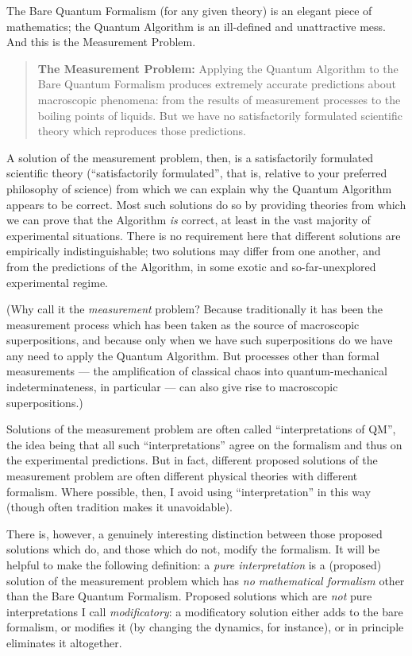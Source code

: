 \documentclass[12pt]{article}
\begin{document}
 The Bare Quantum Formalism (for any given theory) is an elegant piece of mathematics; the Quantum Algorithm is an ill-defined and unattractive mess.  And this is the Measurement Problem.
\begin{quote}
\textbf{The Measurement Problem:} Applying the Quantum Algorithm to the Bare Quantum Formalism produces extremely accurate predictions about macroscopic phenomena: from the results of measurement processes to the boiling points of liquids. But we have no satisfactorily formulated scientific theory which reproduces those predictions.
\end{quote}

A solution of the measurement problem, then, is a satisfactorily formulated scientific theory (``satisfactorily formulated'', that is, relative to your preferred philosophy of science) from which we can explain why the Quantum Algorithm appears to be correct. Most such solutions do so by providing theories from which we can prove that the Algorithm \emph{is} correct, at least in the vast majority of experimental situations. There is no requirement here that different solutions are empirically indistinguishable; two solutions may differ from one another, and from the predictions of the Algorithm, in some exotic and so-far-unexplored experimental regime.

(Why call it the \emph{measurement} problem? Because traditionally it has been the measurement process which has been taken as the source of macroscopic superpositions, and because only when we have such superpositions do we have any need to apply the Quantum Algorithm. But processes other than formal measurements --- the amplification of classical chaos into quantum-mechanical indeterminateness, in particular --- can also give rise to macroscopic superpositions.)

Solutions of the measurement problem are often called ``interpretations of QM'', the idea being that all such ``interpretations'' agree on the formalism and thus on the experimental predictions. But in fact, different proposed solutions of the measurement problem are often different physical theories with different formalism. Where possible, then, I avoid using ``interpretation'' in this way (though often tradition makes it unavoidable). 

There is, however, a genuinely interesting distinction between those proposed solutions which do, and those which do not, modify the formalism. It will be helpful to make the following definition: a \emph{pure interpretation} is a (proposed) solution of the measurement problem which has \emph{no mathematical formalism} other than the Bare Quantum Formalism. Proposed solutions which are \emph{not} pure interpretations I call \emph{modificatory}: a modificatory solution either adds to the bare formalism, or modifies it (by changing the dynamics, for instance), or in principle eliminates it altogether.
\end{document}
